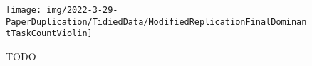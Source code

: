 \begin{figure}
    \centering
    \texttt{[image: img/2022-3-29-PaperDuplication/TidiedData/ModifiedReplicationFinalDominantTaskCountViolin]}
    \caption{TODO} \label{fig:ModifiedReplicationFinalDominantTaskCountViolin}
\end{figure}

